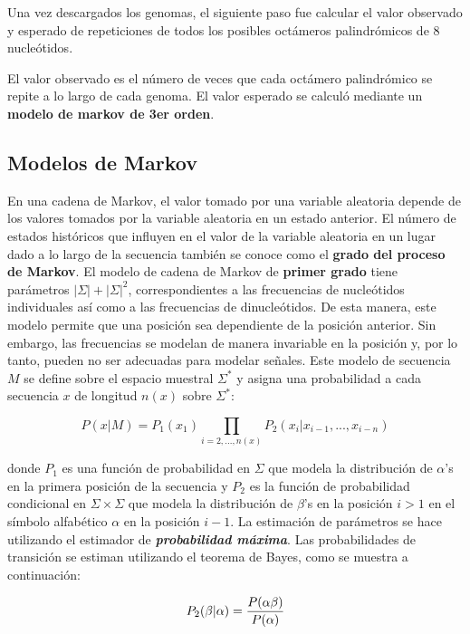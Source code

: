 \documentclass[
]{book}
\begin{document}
Una vez descargados los genomas, el siguiente paso fue calcular el valor observado y esperado de repeticiones de todos los posibles octámeros palindrómicos de 8 nucleótidos.

El valor observado es el número de veces que cada octámero palindrómico se repite a lo largo de cada genoma.
El valor esperado se calculó mediante un \textbf{modelo de markov de 3er orden}.

\hypertarget{modelos-de-markov}{%
\subsection{Modelos de Markov}\label{modelos-de-markov}}

En una cadena de Markov, el valor tomado por una variable aleatoria depende de los valores tomados por la variable aleatoria en un estado anterior. El número de estados históricos que influyen en el valor de la variable aleatoria en un lugar dado a lo largo de la secuencia también se conoce como el \textbf{grado del proceso de Markov}. El modelo de cadena de Markov de \textbf{primer grado} tiene parámetros \(|\Sigma| + |\Sigma|^2\), correspondientes a las frecuencias de nucleótidos individuales así como a las frecuencias de dinucleótidos. De esta manera, este modelo permite que una posición sea dependiente de la posición anterior. Sin embargo, las frecuencias se modelan de manera invariable en la posición y, por lo tanto, pueden no ser adecuadas para modelar señales. Este modelo de secuencia \(M\) se define sobre el espacio muestral \(\Sigma^{*}\) y asigna una probabilidad a cada secuencia \(x\) de longitud \(n(x)\) sobre \(\Sigma^{*}\):

\begin{equation}
P(x|M) = P_1(x_1) \prod_{i=2,...,n(x)} P_2(x_i|x_{i-1},...,x_{i-n})
\label{eq:markov}
\end{equation}

donde \(P_1\) es una función de probabilidad en \(\Sigma\) que modela la distribución de \(\alpha\)'s en la primera posición de la secuencia y \(P_2\) es la función de probabilidad condicional en \(\Sigma\times\Sigma\) que modela la distribución de \(\beta\)'s en la posición \(i>1\) en el símbolo alfabético \(\alpha\) en la posición \(i-1\). La estimación de parámetros se hace utilizando el estimador de \textbf{\emph{probabilidad máxima}}. Las probabilidades de transición se estiman utilizando el teorema de Bayes, como se muestra a continuación:

\begin{equation}
P_2(\beta|\alpha)={P(\alpha\beta) \over P(\alpha)}
\label{eq:bayes}
\end{equation}
\end{document}
